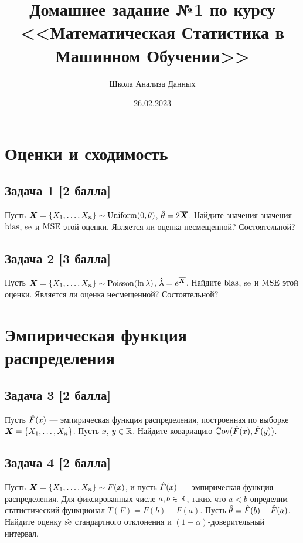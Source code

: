 \documentclass{article}
\title{Домашнее задание №1 по курсу \\ <<Математическая Статистика в Машинном Обучении>>}
\author{Школа Анализа Данных}
\date{26.02.2023}
\begin{document}
\maketitle

\section*{Оценки и сходимость}
\subsection*{Задача 1 [2 балла]}
Пусть $\boldsymbol{X} = \{X_1,\ldots, X_n\} \sim \mathrm{Uniform}(0,\theta)$, $\hat{\theta} = 2\overline{\boldsymbol{X}}$. Найдите значения значения $\mathrm{bias}$, $\mathrm{se}$ и $\mathrm{MSE}$ этой оценки. Является ли оценка несмещенной? Состоятельной?

\subsection*{Задача 2 [3 балла]}
Пусть $\boldsymbol{X} = \{X_1, \dots, X_n\} \sim \mathrm{Poisson}(\ln \lambda)$, $\hat{\lambda} = e^{\overline{\boldsymbol{X}}}$. Найдите $\mathrm{bias}$, $\mathrm{se}$ и $\mathrm{MSE}$ этой оценки. Является ли оценка несмещенной? Состоятельной?

\section*{Эмпирическая функция распределения}
\subsection*{Задача 3 [2 балла]}
Пусть $\hat{F}(x)$ --- эмпирическая функция распределения, построенная по выборке $\boldsymbol{X} = \{X_1, \dots, X_n\}$. Пусть $x$, $y \in \mathbb{R}$. Найдите ковариацию $\mathbb{C}\mathrm{ov}(\hat{F}(x), \hat{F}(y))$.

\subsection*{Задача 4 [2 балла]}
Пусть $\boldsymbol{X} = \{X_1, \dots, X_n\} \sim F(x)$, и пусть $\hat{F}(x)$ --- эмпирическая функция распределения. Для фиксированных числе $a, b\in \mathbb{R}$, таких что $a < b$ определим статистический функционал $T(F) = F(b) - F(a)$. Пусть $\hat{\theta} = \hat{F}(b) - \hat{F}(a)$. Найдите оценку $\hat{\mathrm{se}}$ стандартного отклонения и $(1-\alpha)$-доверительный интервал.
\end{document}
